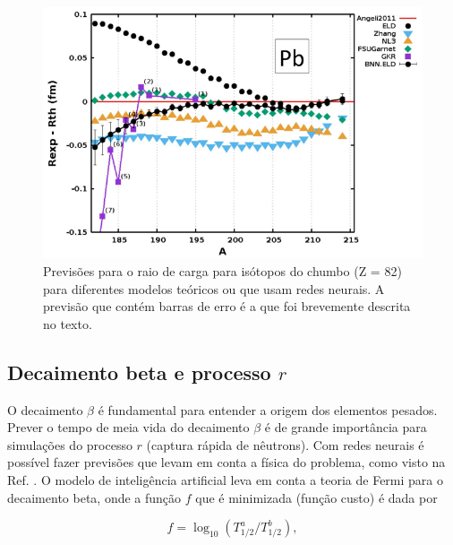\documentclass[a4paper,12pt,oneside]{book}
\begin{document}
\begin{figure}[H]
    \centering
    \includegraphics[scale = 0.60]{figs/radii.png}
    \caption{Previsões para o raio de carga para isótopos do chumbo (Z = 82) para diferentes modelos teóricos ou que usam redes neurais. A previsão que contém barras de erro é a que foi brevemente descrita no texto.}
    \label{fig:radii}
\end{figure}


\subsection{Decaimento beta e processo $r$}

\par O decaimento $\beta$ é fundamental para entender a origem dos elementos pesados. Prever o tempo de meia vida do decaimento $\beta$ é de grande importância para simulações do processo $r$ (captura rápida de nêutrons). Com redes neurais é possível fazer previsões que levam em conta a física do problema, como visto na Ref. \cite{mlbetadecay}. O modelo de inteligência artificial leva em conta a teoria de Fermi para o decaimento beta, onde a função $f$ que é minimizada (função custo) é dada por

\begin{equation}\label{eq:half_life}
    f = \log_{10}(T^{a}_{1/2}/T^{b}_{1/2}),
\end{equation}
\end{document}
